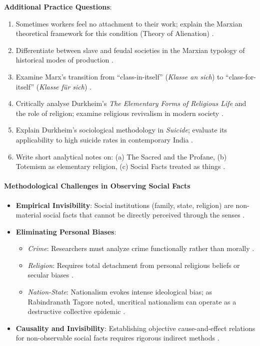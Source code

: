 \begin{PYQLink}
\textbf{Additional Practice Questions}:
\begin{enumerate}
    \item Sometimes workers feel no attachment to their work; explain the Marxian theoretical framework for this condition (Theory of Alienation) .
    \item Differentiate between slave and feudal societies in the Marxian typology of historical modes of production .
    \item Examine Marx's transition from ``class-in-itself'' (\textit{Klasse an sich}) to ``class-for-itself'' (\textit{Klasse f\"ur sich}) .
    \item Critically analyse Durkheim's \textit{The Elementary Forms of Religious Life} and the role of religion; examine religious revivalism in modern society .
    \item Explain Durkheim's sociological methodology in \textit{Suicide}; evaluate its applicability to high suicide rates in contemporary India .
    \item Write short analytical notes on: (a) The Sacred and the Profane, (b) Totemism as elementary religion, (c) Social Facts treated as things .
\end{enumerate}
\end{PYQLink}

\paragraph{Methodological Challenges in Observing Social Facts}
\begin{itemize}
    \item \textbf{Empirical Invisibility}: Social institutions (family, state, religion) are non-material social facts that cannot be directly perceived through the senses .
    \item \textbf{Eliminating Personal Biases}:
    \begin{itemize}
        \item \textit{Crime}: Researchers must analyze crime functionally rather than morally .
        \item \textit{Religion}: Requires total detachment from personal religious beliefs or secular biases .
        \item \textit{Nation-State}: Nationalism evokes intense ideological bias; as Rabindranath Tagore noted, uncritical nationalism can operate as a destructive collective epidemic .
    \end{itemize}
    \item \textbf{Causality and Invisibility}: Establishing objective cause-and-effect relations for non-observable social facts requires rigorous indirect methods .
\end{itemize}


